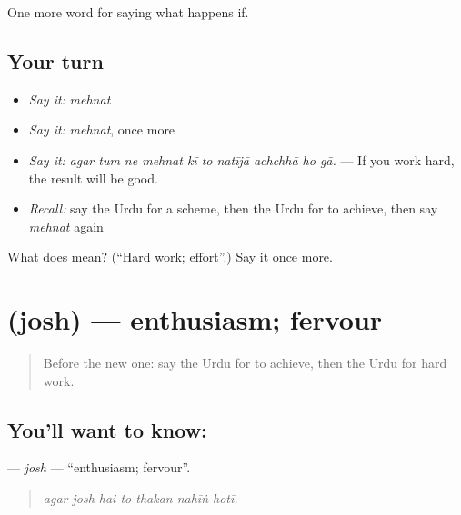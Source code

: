 \begin{grammarlens}[title={What you've built}]
One more word for saying what happens if.
\end{grammarlens}

\subsection*{Your turn}
\begin{itemize}
\raggedright
  \item \emph{Say it:} \emph{mehnat}
  \item \emph{Say it:} \emph{mehnat}, once more
  \item \emph{Say it:} \emph{agar tum ne mehnat kī to natījā achchhā ho gā.} — If you work hard, the result will be good.
  \item \emph{Recall:} say the Urdu for a scheme, then the Urdu for to achieve, then say \emph{mehnat} again
\end{itemize}

\begin{tcolorbox}[breakable,colback=teal!4,colframe=teal!35!black,title={Before you move on}]
What does  mean? (\textquotedblleft{}Hard work; effort\textquotedblright{}.) Say it once more.
\end{tcolorbox}
\section[\texorpdfstring{\ur{جوش} (josh)}{جوش (josh)}]{ (josh) — enthusiasm; fervour}

\label{lesson:UR-C379-josh}



\begin{quote}
Before the new one: say the Urdu for to achieve, then the Urdu for hard work.
\end{quote}

\subsection*{You'll want to know: }
\textbf{} — \emph{josh} — \textquotedblleft{}enthusiasm; fervour\textquotedblright{}.

\begin{quote}
      
\end{quote}

\begin{quote}
\emph{agar josh hai to thakan nahīṅ hotī.}
\end{quote}

